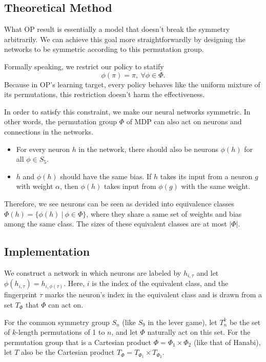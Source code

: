 \documentclass[12pt]{article}
\begin{document}
\begin{spacing}{1.15}
\subsection{Theoretical Method}

What OP result is essentially a model that doesn't break the symmetry arbitrarily. We can achieve this goal more straightforwardly by designing the networks to be symmetric according to this permutation group.

Formally speaking, we restrict our policy to statify \[\phi(\pi)=\pi,~\forall\phi\in\Phi.\] Because in OP's learning target, every policy behaves like the uniform mixture of its permutations, this restriction doesn't harm the effectiveness.

In order to satisfy this constraint, we make our neural networks symmetric. In other words, the permutation group $\Phi$ of MDP can also act on neurons and connections in the networks.

\begin{itemize}
  \item For every neuron $h$ in the network, there should also be neurons $\phi(h)$ for all $\phi\in S_5$.
  \item $h$ and $\phi(h)$ should have the same bias. If $h$ takes its input from a neuron $g$ with weight $\alpha$, then $\phi(h)$ takes input from $\phi(g)$ with the same weight.
\end{itemize}

Therefore, we see neurons can be seen as devided into equivalence classes $\Phi(h) = \{\phi(h)~|~\phi\in\Phi\}$, where they share a same set of weights and bias among the same class. The sizes of these equivalent classes are at most $|\Phi|$.

\subsection{Implementation}

We construct a network in which neurons are labeled by $h_{i,\tau}$ and let $\phi(h_{i,\tau})=h_{i,\phi(\tau)}$. Here, $i$ is the index of the equivalent class, and the fingerprint $\tau$ marks the neuron's index in the equivalent class and is drawn from a set $T_\Phi$ that $\Phi$ can act on.

For the common symmetry group $S_n$ (like $S_9$ in the lever game), let $T_n^k$ be the set of $k$-length permutations of 1 to $n$, and let $\Phi$ naturally act on this set. For the permutation group that is a Cartesian product $\Phi=\Phi_1\times\Phi_2$ (like that of Hanabi), let $T$ also be the Cartesian product $T_\Phi=T_{\Phi_1}\times T_{\Phi_2}$.


\end{spacing}
\end{document}
